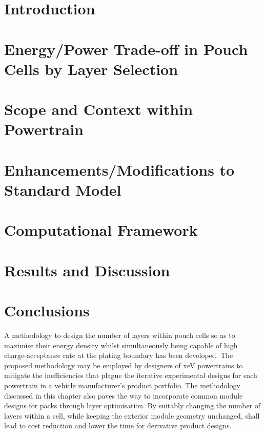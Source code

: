 \vfill
\pagebreak



\section[Introduction]{Introduction}\label{sec:layeroptintro}


\section{Energy/Power Trade-off in Pouch Cells by Layer Selection}\label{sec:energypowertradeoff}


\section{Scope and Context within  Powertrain}


\section{Enhancements/Modifications to Standard  Model}\label{sec:numericalenhancements}


\section{Computational Framework}\label{sec:layeroptframework}


\section{Results and Discussion}\label{sec:resultslayeropt}


\section{Conclusions}

A methodology to design the number of layers within pouch cells so as to
maximise their energy density whilst simultaneously being capable of high
charge-acceptance rate at the plating boundary has been developed. The proposed
methodology may be employed by designers of \gls{xeV} powertrains to mitigate
the inefficiencies that plague the iterative experimental designs for each
powertrain in a vehicle manufacturer's product portfolio.  The methodology
discussed in this chapter also paves the way to incorporate common module
designs for packs through layer optimisation. By suitably changing the number of
layers within a cell, while keeping the exterior module geometry unchanged,
shall lead to cost reduction and lower the time for derivative product designs.

